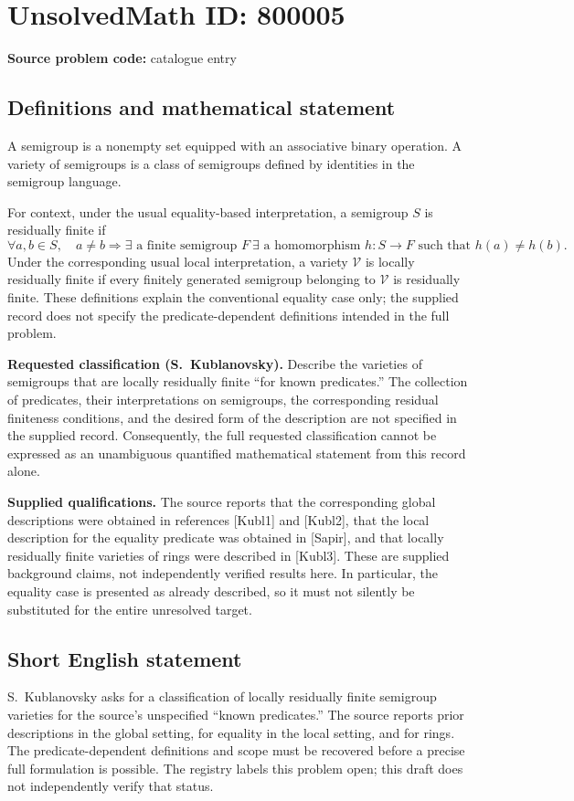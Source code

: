 \documentclass[11pt]{article}
\begin{document}
\section*{UnsolvedMath ID: 800005}
\textbf{Source problem code:} catalogue entry
\subsection{Definitions and mathematical statement}
A semigroup is a nonempty set equipped with an associative binary operation. A variety of semigroups is a class of semigroups defined by identities in the semigroup language.

For context, under the usual equality-based interpretation, a semigroup \(S\) is residually finite if
\[
\forall a,b\in S,\quad a\ne b\Longrightarrow \exists\text{ a finite semigroup }F\ \exists\text{ a homomorphism }h:S\to F\text{ such that }h(a)\ne h(b).
\]
Under the corresponding usual local interpretation, a variety \(\mathcal V\) is locally residually finite if every finitely generated semigroup belonging to \(\mathcal V\) is residually finite. These definitions explain the conventional equality case only; the supplied record does not specify the predicate-dependent definitions intended in the full problem.

\textbf{Requested classification (S.~Kublanovsky).} Describe the varieties of semigroups that are locally residually finite ``for known predicates.'' The collection of predicates, their interpretations on semigroups, the corresponding residual finiteness conditions, and the desired form of the description are not specified in the supplied record. Consequently, the full requested classification cannot be expressed as an unambiguous quantified mathematical statement from this record alone.

\textbf{Supplied qualifications.} The source reports that the corresponding global descriptions were obtained in references [Kubl1] and [Kubl2], that the local description for the equality predicate was obtained in [Sapir], and that locally residually finite varieties of rings were described in [Kubl3]. These are supplied background claims, not independently verified results here. In particular, the equality case is presented as already described, so it must not silently be substituted for the entire unresolved target.
\subsection{Short English statement}
S.~Kublanovsky asks for a classification of locally residually finite semigroup varieties for the source's unspecified ``known predicates.'' The source reports prior descriptions in the global setting, for equality in the local setting, and for rings. The predicate-dependent definitions and scope must be recovered before a precise full formulation is possible. The registry labels this problem open; this draft does not independently verify that status.
\end{document}

